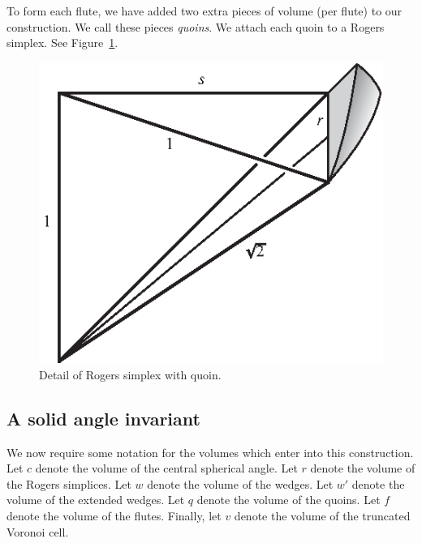 To form each flute, we have added two extra pieces of
volume (per flute) to our construction.
We call these pieces {\em quoins}.  We
attach each quoin to a Rogers simplex.
See Figure~\ref{fig:quad8}.

\begin{figure}
\begin{center}
\includegraphics{PS/quad8}
\end{center}
\caption{Detail of Rogers simplex with quoin.}
\label{fig:quad8}
\end{figure}

\subsection{A solid angle invariant}
We now require some notation for the volumes which enter
into this construction.
Let $c$ denote the volume of the central spherical angle.
Let $r$ denote the volume of the Rogers simplices.
Let $w$ denote the volume of the wedges.
Let $w'$ denote the volume of the extended wedges.
Let $q$ denote the volume of the quoins.
Let $f$ denote the volume of the flutes.
Finally, let $v$ denote the volume of the truncated Voronoi cell.

